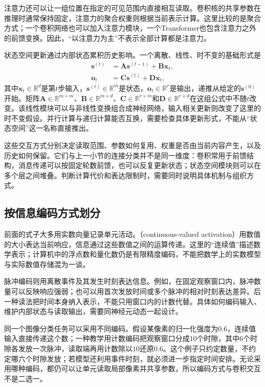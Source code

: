 注意力还可以让一组位置在指定的可见范围内直接相互读取。卷积核的共享参数在推理时通常保持固定，注意力的聚合权重则根据当前表示计算。这里比较的是聚合方式；一个卷积网络也可以加入注意力模块，一个Transformer也包含注意力之外的前馈变换。因此，“以注意力为主”不表示全部计算都是注意力。

状态空间更新通过内部状态累积历史影响。一个离散、线性、时不变的基础形式是
\begin{equation}
  \begin{aligned}
    \bm{s}^{(t)}&=\bm{A}\bm{s}^{(t-1)}+\bm{B}\bm{x}_t,\\
    \bm{o}_t&=\bm{C}\bm{s}^{(t)}+\bm{D}\bm{x}_t,
  \end{aligned}
  \label{eq:neural-basic-state-space}
\end{equation}
其中$\bm{x}_t\in\mathbb{R}^{d}$是第$t$步输入，$\bm{s}^{(t)}\in\mathbb{R}^{m}$是状态，$\bm{o}_t\in\mathbb{R}^{r}$是输出，递推从给定的$\bm{s}^{(0)}$开始。矩阵$\bm{A}\in\mathbb{R}^{m\times m}$、$\bm{B}\in\mathbb{R}^{m\times d}$、$\bm{C}\in\mathbb{R}^{r\times m}$和$\bm{D}\in\mathbb{R}^{r\times d}$在这组公式中不随$t$改变。该线性模块可以与非线性变换组合成神经网络，输入相关更新则改变了这里的时不变假设。并行计算与递归计算能否互换，需要检查具体更新形式，不能从“状态空间”这一名称直接推出。

这些交互方式分别决定读取范围、参数如何复用、权重是否由当前内容产生，以及历史如何保留。它们与上一小节的连接分类并不是同一维度：卷积常用于前馈结构，消息传递可以按固定轮数前馈，也可以反复更新状态；状态空间模块则可以在多个层之间堆叠。判断计算代价和表达限制时，需要同时说明具体机制与组织方式。

\subsection{按信息编码方式划分}
\label{sec:neural-types-encoding}

前面的式子大多用实数向量记录单元活动。（continuous-valued activation）用数值的大小表达当前响应，信息通过这些数值之间的运算传递。这里的“连续值”描述数学表示；计算机中的浮点数和量化数仍是有限精度编码，不能把数学上的实数模型与实际数值存储混为一谈。

脉冲编码则用离散事件及其发生时刻表达信息。例如，在固定观察窗口内，脉冲数量可以反映响应强弱；也可以用首次发放时间或多个脉冲的相对时刻表达差异。后一种读法把时间本身纳入表示，不能只用窗口内的计数代替。具体如何编码输入、维护内部状态与读取输出，需要同神经元动态一起设计。

同一个图像分类任务可以采用不同编码。假设某像素的归一化强度为$0.6$，连续值输入直接传递这个数；一种教学用计数编码把观察窗口分成$10$个时隙，其中$6$个时隙各发放一次脉冲，读取端再用计数除以$10$还原$0.6$。这个例子只约定数量，不约定哪六个时隙发放；若模型还利用事件时刻，就必须进一步指定时间安排。无论采用哪种编码，都仍可以让单元读取局部像素并共享参数，所以编码方式与卷积交互不是二选一。

